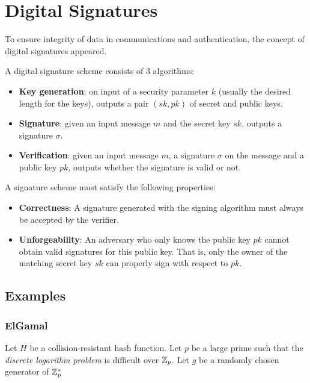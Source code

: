 \section{Digital Signatures}
To ensure integrity of data in communications and authentication, the concept of digital signatures appeared. 

A digital signature scheme consists of 3 algorithms:
\begin{itemize}
    \item \textbf{Key generation}: on input of a security parameter $k$ (usually the desired length for the keys), outputs a pair $(sk, pk)$ of secret and public keys.
    \item \textbf{Signature}: given an input message $m$ and the secret key $sk$, outputs a signature $\sigma$.
    \item \textbf{Verification}: given an input message $m$, a signature $\sigma$ on the message and a public key $pk$, outputs whether the signature is valid or not.
\end{itemize}

A signature scheme must satisfy the following properties:
\begin{itemize}
    \item \textbf{Correctness}: A signature generated with the signing algorithm must always be accepted by the verifier.
    \item \textbf{Unforgeability}: An adversary who only knows the public key $pk$ cannot obtain valid signatures for this public key. That is, only the owner of the matching secret key $sk$ can properly sign with respect to $pk$.
\end{itemize}

\subsection{Examples}
\subsubsection*{ElGamal}
\cite{elGamal85}
Let $H$ be a collision-resistant hash function. Let $p$ be a large prime such that the \textit{discrete logarithm problem} is difficult over ${\mathbb Z}_p$. Let $g$ be a randomly chosen generator of ${\mathbb Z}_p^\ast$

